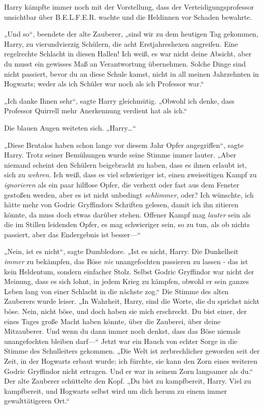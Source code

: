 {Harry kämpfte immer noch mit der Vorstellung, dass der Verteidigungsprofessor unsichtbar über B.E.L.F.E.R. wachte und die Heldinnen vor Schaden bewahrte.

„Und so“, beendete der alte Zauberer, „sind wir zu dem heutigen Tag gekommen, Harry, zu vierundvierzig Schülern, die acht Erstjahreshexen angreifen. Eine regelrechte Schlacht in diesen Hallen! Ich weiß, es war nicht deine Absicht, aber du musst ein gewisses Maß an Verantwortung übernehmen. Solche Dinge sind nicht passiert, bevor du an diese Schule kamst, nicht in all meinen Jahrzehnten in Hogwarts; weder als ich Schüler war noch als ich Professor war.“

„Ich danke Ihnen sehr“, sagte Harry gleichmütig. „Obwohl ich denke, dass Professor Quirrell mehr Anerkennung verdient hat als ich.“

Die blauen Augen weiteten sich. „Harry…“

„Diese Brutalos haben schon lange vor diesem Jahr Opfer angegriffen“, sagte Harry. Trotz seiner Bemühungen wurde seine Stimme immer lauter. „Aber niemand scheint den Schülern beigebracht zu haben, dass es ihnen erlaubt ist, sich zu \emph{wehren}. Ich weiß, dass es viel schwieriger ist, einen zweiseitigen Kampf zu \emph{ignorieren} als ein paar hilflose Opfer, die verhext oder fast aus dem Fenster gestoßen werden, aber es ist nicht unbedingt \emph{schlimmer}, oder? Ich wünschte, ich hätte mehr von Godric Gryffindors Schriften gelesen, damit ich ihn zitieren könnte, da muss doch etwas darüber stehen. Offener Kampf mag \emph{lauter} sein als die im Stillen leidenden Opfer, es mag schwieriger sein, so zu tun, als ob nichts passiert, aber das Endergebnis ist besser—“

„Nein, ist es nicht“, sagte Dumbledore. „Ist es nicht, Harry. Die Dunkelheit \emph{immer} zu bekämpfen, das Böse \emph{nie} unangefochten passieren zu lassen - das ist kein Heldentum, sondern einfacher Stolz. Selbst Godric Gryffindor war nicht der Meinung, dass es sich lohnt, in jedem Krieg zu kämpfen, obwohl er sein ganzes Leben lang von einer Schlacht in die nächste zog.“ Die Stimme des alten Zauberers wurde leiser. „In Wahrheit, Harry, sind die Worte, die du sprichst nicht böse. Nein, nicht böse, und doch haben sie mich erschreckt. Du bist einer, der eines Tages große Macht haben könnte, über die Zauberei, über deine Mitzauberer. Und wenn du dann immer noch denkst, dass das Böse niemals unangefochten bleiben darf—“ Jetzt war ein Hauch von echter Sorge in die Stimme des Schulleiters gekommen. „Die Welt ist zerbrechlicher geworden seit der Zeit, in der Hogwarts erbaut wurde; ich fürchte, sie kann den Zorn eines weiteren Godric Gryffindor nicht ertragen. Und er war in seinem Zorn langsamer als du.“ Der alte Zauberer schüttelte den Kopf. „Du bist zu kampfbereit, Harry. Viel zu kampfbereit, und Hogwarts selbst wird um dich herum zu einem immer gewalttätigeren Ort.“

}
